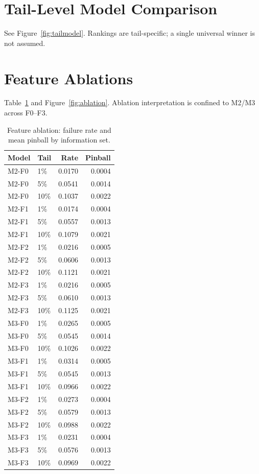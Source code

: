 \documentclass[11pt]{article}
\begin{document}
\section{Tail-Level Model Comparison}
See Figure~\ref{fig:tailmodel}. Rankings are tail-specific; a single universal winner is not assumed.

\section{Feature Ablations}
Table~\ref{tab:ablation} and Figure~\ref{fig:ablation}. Ablation interpretation is confined to M2/M3 across F0--F3.

\begin{table}[ht]
\centering
\caption{Feature ablation: failure rate and mean pinball by information set.}\label{tab:ablation}
\begin{tabular}{llrr}
\hline
\textbf{Model} & \textbf{Tail} & \textbf{Rate} & \textbf{Pinball}\\
\hline
M2-F0 & 1\% & 0.0170 & 0.0004\\
M2-F0 & 5\% & 0.0541 & 0.0014\\
M2-F0 & 10\% & 0.1037 & 0.0022\\
M2-F1 & 1\% & 0.0174 & 0.0004\\
M2-F1 & 5\% & 0.0557 & 0.0013\\
M2-F1 & 10\% & 0.1079 & 0.0021\\
M2-F2 & 1\% & 0.0216 & 0.0005\\
M2-F2 & 5\% & 0.0606 & 0.0013\\
M2-F2 & 10\% & 0.1121 & 0.0021\\
M2-F3 & 1\% & 0.0216 & 0.0005\\
M2-F3 & 5\% & 0.0610 & 0.0013\\
M2-F3 & 10\% & 0.1125 & 0.0021\\
M3-F0 & 1\% & 0.0265 & 0.0005\\
M3-F0 & 5\% & 0.0545 & 0.0014\\
M3-F0 & 10\% & 0.1026 & 0.0022\\
M3-F1 & 1\% & 0.0314 & 0.0005\\
M3-F1 & 5\% & 0.0545 & 0.0013\\
M3-F1 & 10\% & 0.0966 & 0.0022\\
M3-F2 & 1\% & 0.0273 & 0.0004\\
M3-F2 & 5\% & 0.0579 & 0.0013\\
M3-F2 & 10\% & 0.0988 & 0.0022\\
M3-F3 & 1\% & 0.0231 & 0.0004\\
M3-F3 & 5\% & 0.0576 & 0.0013\\
M3-F3 & 10\% & 0.0969 & 0.0022\\
\hline
\end{tabular}
\end{table}
\end{document}
